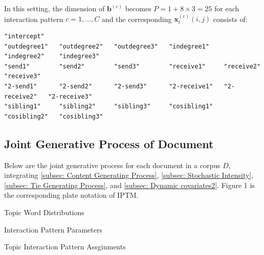 \documentclass[a4paper]{article}
\begin{document}
In this setting, the dimension of  $\boldsymbol{b}^{(c)}$ becomes $P =  1 + 8 \times 3= 25$ for each interaction pattern $c=1,...,C$ and the corresponding $\boldsymbol{x}^{(c)}_{t}(i, j)$ consists of:
\begin{verbatim}
"intercept"    
"outdegree1"   "outdegree2"   "outdegree3"   "indegree1"    "indegree2"    "indegree3"   
"send1"        "send2"        "send3"        "receive1"     "receive2"     "receive3"     
"2-send1"      "2-send2"      "2-send3"      "2-receive1"   "2-receive2"   "2-receive3"  
"sibling1"     "sibling2"     "sibling3"     "cosibling1"   "cosibling2"   "cosibling3"   
\end{verbatim}
\subsection{Joint Generative Process of Document} \label{subsec: Joint Generative Process of Document}
 Below are the joint generative process for each document in a corpus $D$, integrating \ref{subsec: Content Generating Process}, \ref{subsec: Stochastic Intensity}, \ref{subsec: Tie Generating Process}, and \ref{subsec: Dynamic covariates2}.  Figure 1 is the corresponding plate notation of IPTM.
\begin{algorithm}[H]
	\SetAlgoLined
	\caption{Topic Word Distributions}
\end{algorithm}
\begin{algorithm}[H]
	\SetAlgoLined
	\caption{Interaction Pattern Parameters}
\end{algorithm}
\begin{algorithm}[H]
	\SetAlgoLined
	\caption{Topic Interaction Pattern Assginments}
\end{algorithm}
\end{document}
